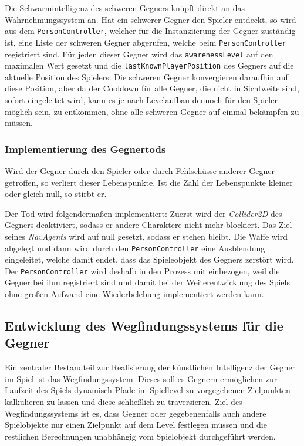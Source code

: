 Die Schwarmintelligenz des schweren Gegners knüpft direkt an das Wahrnehmungssystem an. Hat ein schwerer Gegner den Spieler entdeckt, so wird aus dem \texttt{PersonController}, welcher für die Instanziierung der Gegner zuständig ist, eine Liste der schweren Gegner abgerufen, welche beim \texttt{PersonController} registriert sind. Für jeden dieser Gegner wird das \texttt{awarenessLevel} auf den maximalen Wert gesetzt und die \texttt{lastKnownPlayerPosition} des Gegners auf die aktuelle Position des Spielers. Die schweren Gegner konvergieren daraufhin auf diese Position, aber da der Cooldown für alle Gegner, die nicht in Sichtweite sind, sofort eingeleitet wird, kann es je nach Levelaufbau dennoch für den Spieler möglich sein, zu entkommen, ohne alle schweren Gegner auf einmal bekämpfen zu müssen.

\subsubsection{Implementierung des Gegnertods}
\label{sec:enemyImplementationDeath}

Wird der Gegner durch den Spieler oder durch Fehlschüsse anderer Gegner getroffen, so verliert dieser Lebenspunkte. Ist die Zahl der Lebenspunkte kleiner oder gleich null, so stirbt er.

Der Tod wird folgendermaßen implementiert: Zuerst wird der \textit{Collider2D} des Gegners deaktiviert, sodass er andere Charaktere nicht mehr blockiert. Das Ziel seines \textit{NavAgents} wird auf null gesetzt, sodass er stehen bleibt. Die Waffe wird abgelegt und dann wird durch den \texttt{PersonController} eine Ausblendung eingeleitet, welche damit endet, dass das Spieleobjekt des Gegners zerstört wird. Der \texttt{PersonController} wird deshalb in den Prozess mit einbezogen, weil die Gegner bei ihm registriert sind und damit bei der Weiterentwicklung des Spiels ohne großen Aufwand eine Wiederbelebung implementiert werden kann.

\subsection{Entwicklung des Wegfindungssystems für die Gegner}\label{sec:pathfinding}
Ein zentraler Bestandteil zur Realisierung der künstlichen Intelligenz der Gegner im Spiel ist das Wegfindungssystem. Dieses soll es Gegnern ermöglichen zur Laufzeit des Spiels dynamisch Pfade im Spiellevel zu vorgegebenen Zielpunkten kalkulieren zu lassen und diese schließlich zu traversieren. Ziel des Wegfindungssystems ist es, dass Gegner oder gegebenenfalls auch andere Spielobjekte nur einen Zielpunkt auf dem Level festlegen müssen und die restlichen Berechnungen unabhängig vom Spielobjekt durchgeführt werden.

